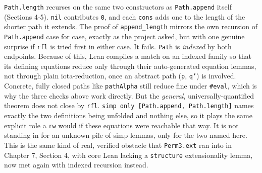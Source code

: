 \texttt{Path.length} recurses on the same two constructors as \texttt{Path.append} itself (Sections 4-5). \texttt{nil} contributes \texttt{0}, and each \texttt{cons} adds one to the length of the shorter path it extends. The proof of \texttt{append\_\allowbreak{}length} mirrors the own recursion of \texttt{Path.append} case for case, exactly as the project asked, but with one genuine surprise if \texttt{rfl} is tried first in either case. It fails. \texttt{Path} is \emph{indexed} by both endpoints. Because of this, Lean compiles a match on an indexed family so that its defining equations reduce only through their auto-generated equation lemmas, not through plain iota-reduction, once an abstract path (\texttt{p}, \texttt{q'}) is involved. Concrete, fully closed paths like \texttt{pathAlpha} still reduce fine under \texttt{\#eval}, which is why the three checks above work directly. But the \emph{general}, universally-quantified theorem does not close by \texttt{rfl}. \texttt{simp only [Path.append, Path.length]} names exactly the two definitions being unfolded and nothing else, so it plays the same explicit role a \texttt{rw} would if these equations were reachable that way. It is not standing in for an unknown pile of simp lemmas, only for the two named here. This is the same kind of real, verified obstacle that \texttt{Perm3.ext} ran into in Chapter 7, Section 4, with core Lean lacking a \texttt{structure} extensionality lemma, now met again with indexed recursion instead.
